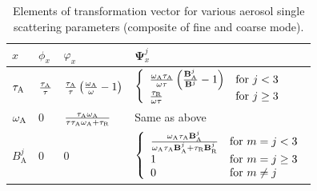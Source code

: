 \begin{table}[t]
  \centering
  \small
  \caption{Elements of transformation vector for various aerosol single
scattering parameters (composite of fine and coarse mode).}
  \label{tab:jacobian1}
  \begin{tabular}{p{2em} p{2em} p{5em} p{15em} }
    \toprule
       $x$ & $\phi_x$ & $ \varphi_x$ & $\pmb{\Psi}_x^j$ \\
    \midrule
    $\tau_\text{A}$        & $\frac{\tau_\text{A}}{\tau}$ &
$\frac{\tau_\text{A}}{\tau}\left( \frac{\omega_\text{A}}{\omega}-1\right)$ &
$\left\{ \begin{array}{ll} \frac{\omega_\text{A}\tau_\text{A}}{\omega\tau}\left(
\frac{\mathbf{B}_\text{A}^j}{\mathbf{B}^j}-1 \right)
&\mbox{for } j<3  \\ \frac{\tau_\text{R}}{\omega\tau} & \mbox{for } j\geq 3
\end{array} \right.$\\  
    $\omega_\text{A}$        & 0 & $\frac{\tau_\text{A}\omega_\text{A}}{\tau\tau_\text{A}\omega_\text{A}+\tau_\text{R}}$ &
Same as above \\
    $B_\text{A}^j$ & 0 & 0 & $\left\{ \begin{array}{ll}
\frac{\omega_\text{A}\tau_\text{A}\mathbf{B}_\text{A}^j}{\omega_\text{A}\tau_\text{A}\mathbf{B}_\text{A}^j+\tau_\text{R}\mathbf{B}_\text{R}^j}
&\mbox{for } m=j<3  \\ 1 & \mbox{for } m=j\geq 3 \\ 0 & \mbox{for }
m\neq j
\end{array} \right.$ \\
    \bottomrule
  \end{tabular}
\end{table}

